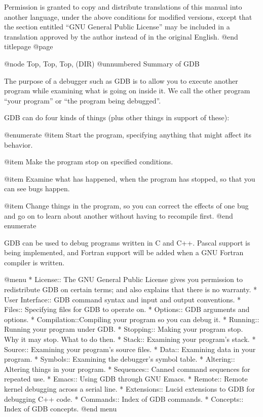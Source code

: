 Permission is granted to copy and distribute translations of this manual
into another language, under the above conditions for modified versions,
except that the section entitled ``GNU General Public License'' may be
included in a translation approved by the author instead of in the
original English.
@end titlepage
@page

@node Top, Top, Top, (DIR)
@unnumbered Summary of GDB

The purpose of a debugger such as GDB is to allow you to execute another
program while examining what is going on inside it.  We call the other
program ``your program'' or ``the program being debugged''.

GDB can do four kinds of things (plus other things in support of these):

@enumerate
@item
Start the program, specifying anything that might affect its behavior.

@item
Make the program stop on specified conditions.

@item
Examine what has happened, when the program has stopped, so that you
can see bugs happen.

@item
Change things in the program, so you can correct the effects of one bug
and go on to learn about another without having to recompile first.
@end enumerate

GDB can be used to debug programs written in C and C++.  Pascal support
is being implemented, and Fortran support will be added when a GNU
Fortran compiler is written.

@menu
* License::    The GNU General Public License gives you permission
	       to redistribute GDB on certain terms; and also
	       explains that there is no warranty.
* User Interface::      GDB command syntax and input and output conventions.
* Files::      Specifying files for GDB to operate on.
* Options::    GDB arguments and options.
* Compilation::Compiling your program so you can debug it.
* Running::    Running your program under GDB.
* Stopping::   Making your program stop.  Why it may stop.  What to do then.
* Stack::      Examining your program's stack.
* Source::     Examining your program's source files.
* Data::       Examining data in your program.
* Symbols::    Examining the debugger's symbol table.
* Altering::   Altering things in your program.
* Sequences::  Canned command sequences for repeated use.
* Emacs::      Using GDB through GNU Emacs.
* Remote::     Remote kernel debugging across a serial line.
* Extensions:: Lucid extensions to GDB for debugging C++ code.
* Commands::   Index of GDB commands.
* Concepts::   Index of GDB concepts.
@end menu

